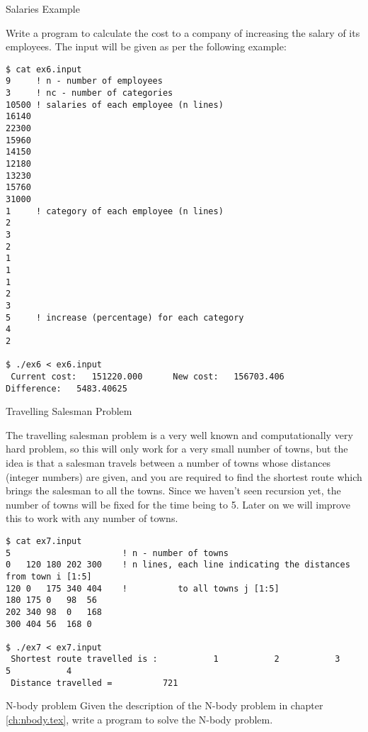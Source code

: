  {Salaries Example}
\label{ex:basic-salaries}

Write a program to calculate the cost to a company of increasing the salary of
its employees. The input will be given as per the following example:

\begin{verbatim}
$ cat ex6.input
9     ! n - number of employees
3     ! nc - number of categories
10500 ! salaries of each employee (n lines)
16140
22300
15960
14150
12180
13230
15760
31000
1     ! category of each employee (n lines)
2
3
2
1
1
1
2
3
5     ! increase (percentage) for each category
4
2

$ ./ex6 < ex6.input
 Current cost:   151220.000      New cost:   156703.406     Difference:   5483.40625    
\end{verbatim}


 {Travelling Salesman Problem}
\label{ex:basic-tsp}

The travelling salesman problem is a very well known and computationally very
hard problem, so this will only work for a very small number of towns, but the
idea is that a salesman travels between a number of towns whose distances
(integer numbers) are given, and you are required to find the shortest route
which brings the salesman to all the towns. Since we haven't seen recursion yet,
the number of towns will be fixed for the time being to 5. Later on we will
improve this to work with any number of towns.

\begin{verbatim}
$ cat ex7.input
5                      ! n - number of towns
0   120 180 202 300    ! n lines, each line indicating the distances from town i [1:5]
120 0   175 340 404    !          to all towns j [1:5]
180 175 0   98  56
202 340 98  0   168
300 404 56  168 0

$ ./ex7 < ex7.input
 Shortest route travelled is :           1           2           3           5           4
 Distance travelled =          721
\end{verbatim}

 {N-body problem}
\label{ex:basic-nbody}
Given the description of the N-body problem in chapter \ref{ch:nbody.tex}, write
a program to solve the N-body problem.




